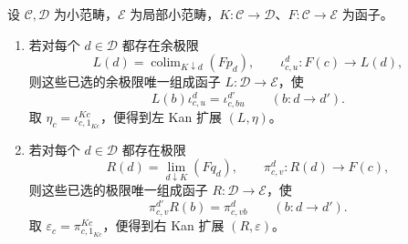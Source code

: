 \begin{theorem}[逗号范畴上的逐点构造]\label{b4:thm:pointwise-kan-extension}
	设 \(\mathcal C,\mathcal D\) 为小范畴，\(\mathcal E\) 为局部小范畴，\(K:\mathcal C\rightarrow\mathcal D\)、\(F:\mathcal C\rightarrow\mathcal E\) 为函子。
	\begin{enumerate}
		\item 若对每个 \(d\in\mathcal D\) 都存在余极限
		\[
			L(d)=\operatorname{colim}_{K\downarrow d}(F p_d),
			\qquad \iota^d_{c,u}:F(c)\longrightarrow L(d),
		\]
		则这些已选的余极限唯一组成函子 \(L:\mathcal D\rightarrow\mathcal E\)，使
		\begin{equation}\label{b4:eq:pointwise-left-kan-arrows}
			L(b)\iota^d_{c,u}=\iota^{d'}_{c,bu}
			\qquad(b:d\longrightarrow d').
		\end{equation}
		取 \(\eta_c=\iota^{Kc}_{c,1_{Kc}}\)，便得到左 Kan 扩展 \((L,\eta)\)。
		\item 若对每个 \(d\in\mathcal D\) 都存在极限
		\[
			R(d)=\lim_{d\downarrow K}(F q_d),
			\qquad \pi^d_{c,v}:R(d)\longrightarrow F(c),
		\]
		则这些已选的极限唯一组成函子 \(R:\mathcal D\rightarrow\mathcal E\)，使
		\begin{equation}\label{b4:eq:pointwise-right-kan-arrows}
			\pi^{d'}_{c,v}R(b)=\pi^d_{c,vb}
			\qquad(b:d\longrightarrow d').
		\end{equation}
		取 \(\varepsilon_c=\pi^{Kc}_{c,1_{Kc}}\)，便得到右 Kan 扩展 \((R,\varepsilon)\)。
	\end{enumerate}
\end{theorem}
